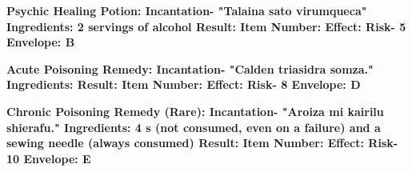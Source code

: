 \documentclass[green]{Kos}
\begin{document}
\bf{Psychic Healing Potion:}
Incantation- "Talaina sato virumqueca"
Ingredients: 2 servings of alcohol
Result: \iPsychicHealthRemedy{\MYname}
Item Number: \iPsychicHealthRemedy{\MYnumber}
Effect: \iPsychicHealthRemedy{\MYtext}
Risk- 5
Envelope: B


\bf{Acute Poisoning Remedy:}
Incantation- "Calden triasidra somza."
Ingredients: \iHerbs{}
Result: \iAcutePoisonRemedy{\MYname}
Item Number: \iAcutePoisonRemedy{\MYnumber}
Effect: \iAcutePoisonRemedy{\MYtext}
Risk- 8
Envelope: D

\bf{Chronic Poisoning Remedy (Rare):}
Incantation- "Aroiza mi kairilu shierafu."
Ingredients: 4 \iEmerald{\MYname}s (not consumed, even on a failure) and a sewing needle (always consumed)
Result: \iChronicPoisonRemedy{\MYname}
Item Number: \iChronicPoisonRemedy{\MYnumber}
Effect: \iChronicPoisonRemedy{\MYtext}
Risk- 10
Envelope: E
\end{document}
